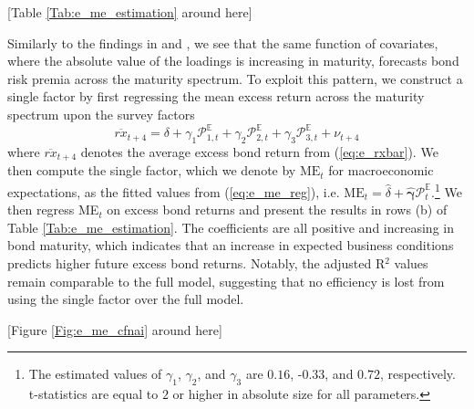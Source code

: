 \documentclass[12pt,letterpaper,leqno,doublespacing]{article}
\begin{document}
\begin{center}
    [Table \ref{Tab:e_me_estimation} around here]
\end{center}

Similarly to the findings in \cite{CochranePiazzesi2005} and \cite{LudvigsonNg2009}, we see that the same function of covariates, where the absolute value of the loadings is increasing in maturity, forecasts bond risk premia across the maturity spectrum. To exploit this pattern, we construct a single factor by first regressing the mean excess return across the maturity spectrum upon the survey factors
\begin{equation}
    \overline{rx}_{t+4} = \delta + \gamma_{1}\mathcal{P}_{1,t}^{\mathbb{E}} + \gamma_{2}\mathcal{P}_{2,t}^{\mathbb{E}} + \gamma_{3}\mathcal{P}_{3,t}^{\mathbb{E}} + \nu_{t+4}
    \label{eq:e_me_reg}
\end{equation}
where $\overline{rx}_{t+4}$ denotes the average excess bond return from (\ref{eq:e_rxbar}). We then compute the single factor, which we denote by $\text{ME}_{t}$ for macroeconomic expectations, as the fitted values from (\ref{eq:e_me_reg}), i.e. $\text{ME}_{t} = \widehat{\delta} + \widehat{\boldsymbol{\gamma}}\mathcal{P}_{t}^{\mathbb{E}}$.\footnote{The estimated values of $\gamma_{1}$, $\gamma_{2}$, and $\gamma_{3}$ are $0.16$, -$0.33$, and $0.72$, respectively. \cite{HansenHodrick1980} t-statistics are equal to $2$ or higher in absolute size for all parameters.} We then regress ME$_{t}$ on excess bond returns and present the results in rows (b) of Table \ref{Tab:e_me_estimation}. The coefficients are all positive and increasing in bond maturity, which indicates that an increase in expected business conditions predicts higher future excess bond returns. Notably, the adjusted R$^{2}$ values remain comparable to the full model, suggesting that no efficiency is lost from using the single factor over the full model. 

\begin{center}
    [Figure \ref{Fig:e_me_cfnai} around here]
\end{center}
\end{document}
